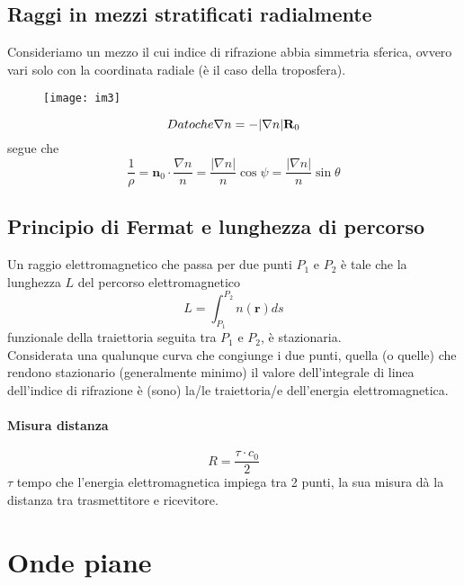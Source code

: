 \documentclass[a4paper]{article}
\begin{document}
\subsection*{Raggi in mezzi stratificati radialmente}
Consideriamo un mezzo il cui indice di rifrazione abbia simmetria sferica, ovvero vari solo con la coordinata radiale (è il caso della troposfera).
\begin{figure}[ht] 
\centering
\texttt{[image: im3]}
\end{figure}
\begin{equation*}
$$Dato che$$\nabla n=-|\nabla n|\textbf{R}_0
\end{equation*}
segue che
\begin{equation*}
\frac{1}{\rho}=\textbf{n}_0\cdot\frac{\nabla n}{n}=\frac{|\nabla n|}{n}\cos\psi=\frac{|\nabla n|}{n}\sin\theta
\end{equation*}
\subsection*{Principio di Fermat e lunghezza di percorso}
Un raggio elettromagnetico che passa per due punti $P_1$ e $P_2$ è tale che la lunghezza
$L$ del percorso elettromagnetico
\begin{equation*}
L=\int_{P_1}^{P_2}n(\textbf{r})ds
\end{equation*}
funzionale della traiettoria seguita tra $P_1$ e $P_2$, è stazionaria.\\
Considerata una qualunque curva che congiunge i due punti, quella (o quelle) che
rendono stazionario (generalmente minimo) il valore dell’integrale di linea dell’indice
di rifrazione è (sono) la/le traiettoria/e dell’energia elettromagnetica.
\paragraph*{Misura distanza}
\begin{equation*}
R=\frac{\tau\cdot c_0}{2}
\end{equation*}
$\tau$ tempo che l'energia elettromagnetica impiega tra 2 punti, la sua misura dà la distanza tra trasmettitore e ricevitore.
\section{Onde piane}
\end{document}

